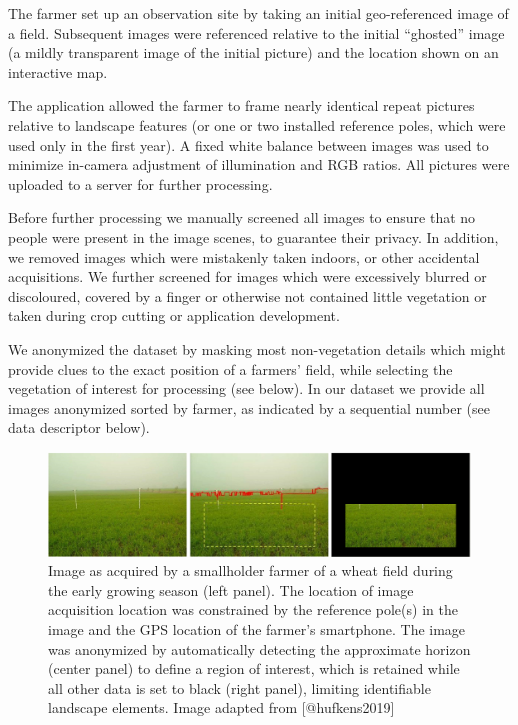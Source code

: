 \documentclass[, manuscript]{copernicus}
\begin{document}
The farmer set up an observation site by taking an initial
geo-referenced image of a field. Subsequent images were referenced
relative to the initial ``ghosted'' image (a mildly transparent image of
the initial picture) and the location shown on an interactive map.

The application allowed the farmer to frame nearly identical repeat
pictures relative to landscape features (or one or two installed
reference poles, which were used only in the first year). A fixed white
balance between images was used to minimize in-camera adjustment of
illumination and RGB ratios. All pictures were uploaded to a server for
further processing.

Before further processing we manually screened all images to ensure that
no people were present in the image scenes, to guarantee their privacy.
In addition, we removed images which were mistakenly taken indoors, or
other accidental acquisitions. We further screened for images which were
excessively blurred or discoloured, covered by a finger or otherwise not
contained little vegetation or taken during crop cutting or application
development.

We anonymized the dataset by masking most non-vegetation details which
might provide clues to the exact position of a farmers' field, while
selecting the vegetation of interest for processing (see below). In our
dataset we provide all images anonymized sorted by farmer, as indicated
by a sequential number (see data descriptor below).

\begin{figure}
\includegraphics[width=16cm]{./figures/image_processing} \caption{Image as acquired by a smallholder farmer of a wheat field during the early growing season (left panel). The location of image acquisition location was constrained by the reference pole(s) in the image and the GPS location of the farmer's smartphone. The image was anonymized by automatically detecting the approximate horizon (center panel) to define a region of interest, which is retained while all other data is set to black (right panel), limiting identifiable landscape elements. Image adapted from [@hufkens2019]}\label{fig:unnamed-chunk-1}
\end{figure}
\end{document}
